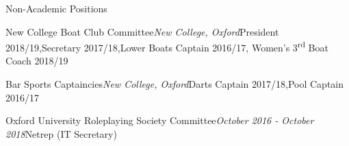 \documentclass{resume} %
\begin{document}
\begin{rSection}{Non-Academic Positions}

\begin{rSubsectionNoContent}{New College Boat Club Committee}{\em New College, Oxford}{President 2018/19,\quad Secretary 2017/18,\quad Lower Boats Captain 2016/17, \newline Women's 3\textsuperscript{rd} Boat Coach 2018/19}{}
\end{rSubsectionNoContent}


\begin{rSubsectionNoContent}{Bar Sports Captaincies}{\em New College, Oxford}{Darts Captain 2017/18,\quad Pool Captain 2016/17}{}
\end{rSubsectionNoContent}


\begin{rSubsectionNoContent}{Oxford University Roleplaying Society Committee}{\em October 2016 - October 2018}{Netrep (IT Secretary)}{}
\end{rSubsectionNoContent}

\end{rSection}
\end{document}

